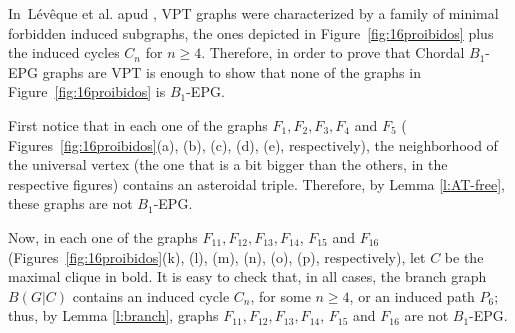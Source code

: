 In~L{\'e}v{\^e}que et al. \cite{leveque2009characterizing} apud \cite{alcon2015characterizing},  VPT graphs were characterized by a family of minimal forbidden induced subgraphs,
the ones depicted in 
Figure~\ref{fig:16proibidos} plus the induced cycles $C_n$ for $n\geq 4$. Therefore, in order to prove
that Chordal $B_1$-EPG graphs are VPT is enough to show that none of the graphs in Figure~\ref{fig:16proibidos} 
is $B_1$-EPG. %

First notice that in each one of the graphs $F_{1}, F_{2}, F_{3}, F_{4}$ and $F_{5}$ ( Figures~\ref{fig:16proibidos}(a), (b), (c), (d), (e), respectively), the neighborhood of the universal vertex (the one that is a bit bigger than the others, in the respective figures) contains an asteroidal triple. Therefore, by Lemma \ref{l:AT-free}, these graphs are not  $B_1$-EPG.

Now, in each one of the graphs $F_{11}, F_{12}, F_{13}, F_{14}$, $F_{15}$ and $F_{16}$  (Figures~\ref{fig:16proibidos}(k), (l), (m), (n), (o), (p), respectively), let $C$ be the maximal clique in bold. It is easy to check that, in all cases, the branch graph $B(G|C)$ contains an induced cycle $C_n$, for some $n\geq 4$, or an induced path $P_6$; thus, by Lemma \ref{l:branch},  graphs $F_{11}, F_{12}, F_{13}, F_{14}$, $F_{15}$ and $F_{16}$ are not $B_1$-EPG.





